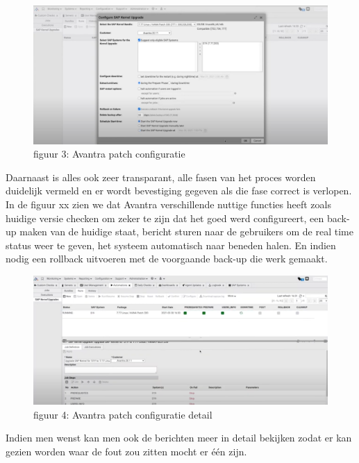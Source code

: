 \documentclass[dutch,dit,thesis]{hogentreport}
\begin{document}
 \begin{figure}[htbp]
    \centering
    \includegraphics[width=\textwidth]{avantra1.png}
    \caption{figuur 3: Avantra patch configuratie}
     \label{fig:avantra1}
\end{figure}




Daarnaast is alles ook zeer transparant, alle fasen van het proces worden duidelijk vermeld en er wordt bevestiging gegeven als die fase correct is verlopen. In de figuur xx zien we dat Avantra verschillende
nuttige functies heeft zoals huidige versie checken om zeker te zijn dat het goed werd configureert, een back-up maken van de huidige staat, bericht sturen naar de gebruikers om de real time status weer
   te geven, het systeem automatisch naar beneden halen. En indien nodig een rollback uitvoeren met de voorgaande back-up die werk gemaakt.

   \begin{figure}[htbp]
    \centering
    \includegraphics[width=\textwidth]{avantra2.png}
    \caption{figuur 4: Avantra patch configuratie detail}
     \label{fig:avantra2}
\end{figure}



Indien men wenst kan men ook de berichten meer in detail bekijken zodat er kan gezien worden waar de fout zou zitten mocht er één zijn.
\end{document}
